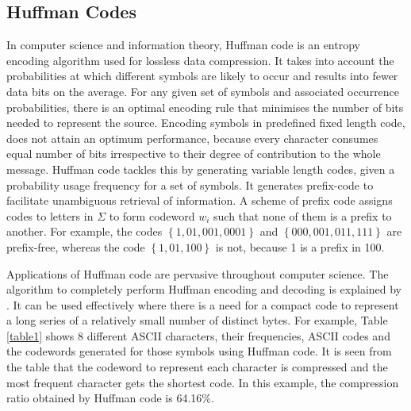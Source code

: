 \documentclass[preprint,12pt]{elsarticle}
\begin{document}
\subsection{Huffman Codes}
In computer science and information theory, Huffman code is an entropy encoding algorithm used for lossless data compression. It takes into account the probabilities at which different symbols are likely to occur and results into fewer data bits on the average. 
For any given set of symbols and associated occurrence probabilities, there is an optimal encoding rule that minimises the number of bits needed to represent the source. Encoding symbols in predefined fixed length code, does not attain an optimum performance, because every character consumes equal number of bits irrespective to their degree of contribution to the whole message. Huffman code tackles this by generating variable length codes, given a probability usage frequency for a set of symbols. It generates prefix-code to facilitate unambiguous retrieval of information. A scheme of prefix code assigns codes to letters in $\Sigma$ to form codeword $w_i$ such that none of them is a prefix to another. For example, the codes $\left\{ 1,01,001,0001\right\}$ and $\left\{ 000,001,011,111\right\}$ are prefix-free, whereas the code $\left\{ 1,01,100\right\}$ is not, because 1 is a prefix in 100.

Applications of Huffman code are pervasive throughout
computer science. The algorithm to completely perform Huffman encoding and decoding is explained by \cite{Amst86}. It can be used effectively where there is a need for a compact code to represent a long series of a relatively small number of distinct bytes. For example, Table \ref{table1} shows 8 different ASCII characters, their frequencies, ASCII codes and the codewords generated for those symbols using Huffman code. It is seen from the table that the codeword to represent each character is compressed and the most frequent character gets the shortest code. In this example, the compression ratio obtained by Huffman code is 64.16\%.   
\end{document}
